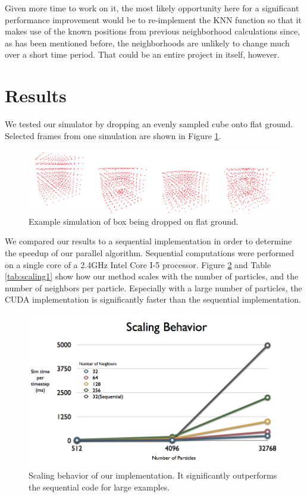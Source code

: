 \documentclass[cameraready]{acmsiggraph-awb}
\begin{document}
Given more time to work on it, the most likely opportunity here for a significant performance improvement would be to re-implement the KNN function so that it makes use of the known positions from previous neighborhood calculations since, as has been mentioned before, the neighborhoods are unlikely to change much over a short time period.
That could be an entire project in itself, however.

\section{Results}

We tested our simulator by dropping an evenly sampled cube onto flat ground.  Selected frames from one simulation are shown in Figure \ref{fig:combined}.  
\begin{figure}
\begin{centering}
\includegraphics[width = 5in]{Figures/combined.png}
\caption{Example simulation of box being dropped on flat ground.}
\label{fig:combined}
\end{centering}
\end{figure}


We compared our results to a sequential implementation in order to determine the speedup of our parallel algorithm.  Sequential computations were performed on a single core of a 2.4GHz Intel Core I-5 processor.  Figure \ref{fig:scaling1} and Table \ref{tab:scaling1} show how our method scales with the number of particles, and the number of neighbors per particle.  Especially with a large number of particles, the CUDA implementation is significantly faster than the sequential implementation.


\begin{figure}
\begin{centering}
\includegraphics[width = 5in]{Figures/charts_001.png}
\caption{Scaling behavior of our implementation.  It significantly outperforms the sequential code for large examples.}
\label{fig:scaling1}
\end{centering}
\end{figure}
\end{document}
